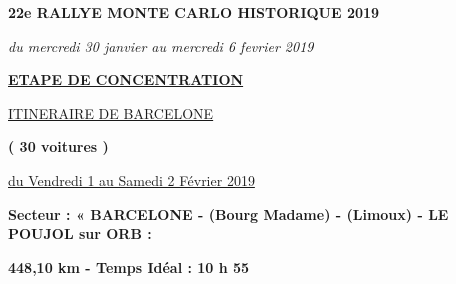 \documentclass{article}%
\begin{document}
%
\normalsize%
\begin{center} \textbf{\LARGE{22e RALLYE MONTE CARLO HISTORIQUE 2019}} \end{center}%
\begin{center} \textit{du mercredi 30 janvier au mercredi 6 fevrier 2019} \end{center}%
\begin{center} \textbf{\underline{ETAPE DE CONCENTRATION}} \end{center}%
\begin{center} \underline{ITINERAIRE DE BARCELONE} \end{center}%
\begin{center} \textbf{( 30 voitures )} \end{center}%
\begin{flushright} \underline{du Vendredi 1 au Samedi 2 Février 2019} \end{flushright}%
\begin{flushleft} \textbf{Secteur : « BARCELONE - (Bourg Madame) - (Limoux) - LE POUJOL sur ORB  :
} \end{flushleft}%
\begin{flushright} \textbf{448,10 km - Temps Idéal : 10 h 55} \end{flushright}%
\end{document}
